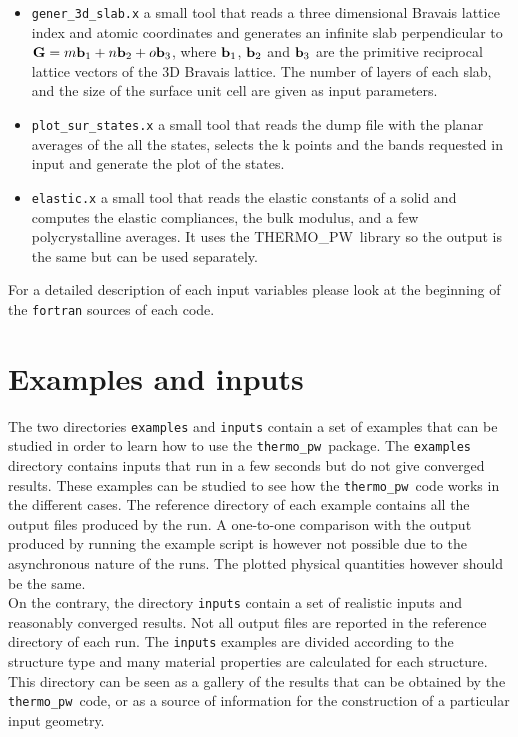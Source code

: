 \documentclass[12pt,a4paper]{article}
\def\tpw{{\sc THERMO\_PW}}
\def\thermo{\texttt{thermo\_pw}}
\begin{document}
\begin{itemize}
\item \texttt{gener\_3d\_slab.x} a small tool that reads a three dimensional
Bravais lattice index and atomic coordinates and generates an infinite slab
perpendicular to ${\bf G} = m {\bf b}_1 + n {\bf b}_2 + o {\bf b}_3$, where
${\bf b}_1$, ${\bf b}_2$ and ${\bf b}_3$ are the primitive reciprocal lattice
vectors of the 3D Bravais lattice. The number of layers of each slab, and the
size of the surface unit cell are given as input parameters.

\item \texttt{plot\_sur\_states.x} a small tool that reads the dump file
with the planar averages of the all the states, selects the k points
and the bands requested in input and generate the plot of the states.

\item \texttt{elastic.x} a small tool that reads the elastic constants of a
solid and computes the elastic compliances, the bulk modulus, and a few
polycrystalline averages. It uses the \tpw\ library so the output is the
same but can be used separately. 

\end{itemize}

For a detailed description of each input variables please look at the beginning 
of the \texttt{fortran} sources of each code.

\section{Examples and inputs}

The two directories \texttt{examples} and \texttt{inputs} contain a set
of examples that can be studied in order to learn how to use the \thermo\ 
package. The \texttt{examples} directory contains inputs that run in a few
seconds but do not give converged results. These examples can be studied 
to see how the \thermo\ code works in the different cases. The
reference directory of each example contains all the output
files produced by the run. A one-to-one comparison with the output
produced by running the example script is however not possible due to the
asynchronous nature of the runs. The plotted physical quantities however
should be the same. \\
On the contrary, the directory \texttt{inputs} contain a set
of realistic inputs and reasonably converged results. Not all
output files are reported in the reference directory of each run.
The \texttt{inputs} examples are divided according to the structure type
and many material properties are calculated for each structure.
This directory can be seen as a gallery of the results that can be
obtained by the \thermo\ code, or as a source of information for the
construction of a particular input geometry.
\end{document}
